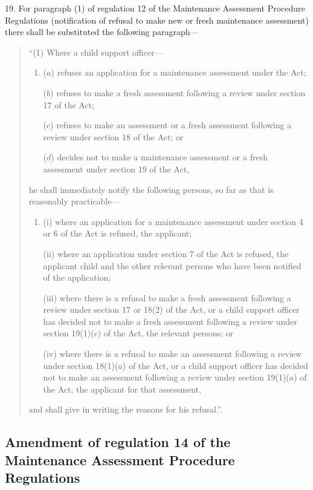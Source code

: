 \documentclass[a4paper]{article}
\begin{document}
19.  For paragraph (1) of regulation 12 of the Maintenance Assessment Procedure Regulations (notification of refusal to make new or fresh maintenance assessment) there shall be substituted the following paragraph—
\begin{quotation}
“(1) Where a child support officer—
\begin{enumerate}\item[]
($a$) refuses an application for a maintenance assessment under the Act;

($b$) refuses to make a fresh assessment following a review under section 17 of the Act;

($c$) refuses to make an assessment or a fresh assessment following a review under section 18 of the Act; or

($d$) decides not to make a maintenance assessment or a fresh assessment under section 19 of the Act,
\end{enumerate}
he shall immediately notify the following persons, so far as that is reasonably practicable—
\begin{enumerate}\item[]
(i) where an application for a maintenance assessment under section 4 or 6 of the Act is refused, the applicant;

(ii) where an application under section 7 of the Act is refused, the applicant child and the other relevant persons who have been notified of the application;

(iii) where there is a refusal to make a fresh assessment following a review under section 17 or 18(2) of the Act, or a child support officer has decided not to make a fresh assessment following a review under section 19(1)($c$) of the Act, the relevant persons; or

(iv) where there is a refusal to make an assessment following a review under section 18(1)($a$) of the Act, or a child support officer has decided not to make an assessment following a review under section 19(1)($a$) of the Act, the applicant for that assessment,
\end{enumerate}
and shall give in writing the reasons for his refusal.”.
\end{quotation}

\subsection[20. Amendment of regulation 14 of the Maintenance Assessment Procedure Regulations]{Amendment of regulation 14 of the Maintenance Assessment Procedure Regulations}
\end{document}
